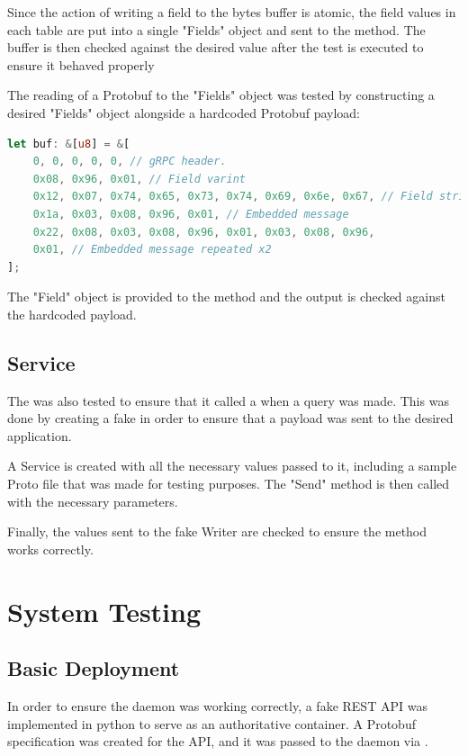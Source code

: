 \documentclass[a4paper,12pt]{report}
\begin{document}
Since the action of writing a field to the bytes buffer is atomic, the field values in each table are put into a single "Fields" object and sent to the method.
The buffer is then checked against the desired value after the test is executed to ensure it behaved properly

The reading of a Protobuf to the "Fields" object was tested by constructing a desired "Fields" object alongside a hardcoded Protobuf payload:
\begin{lstlisting}[language=Rust]
let buf: &[u8] = &[
    0, 0, 0, 0, 0, // gRPC header.
    0x08, 0x96, 0x01, // Field varint
    0x12, 0x07, 0x74, 0x65, 0x73, 0x74, 0x69, 0x6e, 0x67, // Field string
    0x1a, 0x03, 0x08, 0x96, 0x01, // Embedded message
    0x22, 0x08, 0x03, 0x08, 0x96, 0x01, 0x03, 0x08, 0x96,
    0x01, // Embedded message repeated x2
];
\end{lstlisting}

The "Field" object is provided to the method and the output is checked against the hardcoded payload.

\subsection{Service}
The \textit{} was also tested to ensure that it called a \textit{} when a query was made.
This was done by creating a fake  in order to ensure that a payload was sent to the desired application. 

A Service is created with all the necessary values passed to it, including a sample Proto file that was made for testing purposes.
The "Send" method is then called with the necessary parameters. 

Finally, the values sent to the fake Writer are checked to ensure the method works correctly.

\section{System Testing}
\label{sec:test}
\subsection{Basic Deployment}
In order to ensure the daemon was working correctly, a fake REST API was implemented in python to serve as an authoritative container.
A Protobuf specification was created for the API, and it was passed to the daemon via \textit{}.
\end{document}
